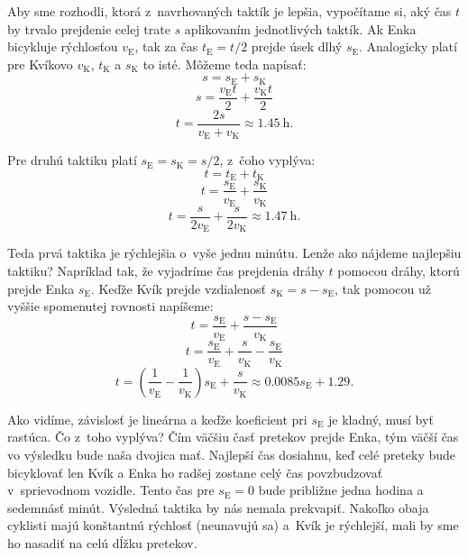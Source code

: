 Aby sme rozhodli, ktorá z~navrhovaných taktík je lepšia, vypočítame si, aký čas $t$ by trvalo prejdenie celej trate $s$ aplikovaním jednotlivých taktík.
Ak Enka bicykluje rýchlosťou $v_{\mathrm{E}}$, tak za čas $t_{\mathrm{E}} = t/2$ prejde úsek dlhý $s_{\mathrm{E}}$.
Analogicky platí pre Kvíkovo $v_{\mathrm{K}}$, $t_{\mathrm{K}}$ a $s_{\mathrm{K}}$ to isté. Môžeme teda napísať:
$$s=s_{\mathrm{E}} + s_{\mathrm{K}}$$
$$s=\frac{v_{\mathrm{E}} t}{2} + \frac{v_{\mathrm{K}} t}{2}$$
$$t=\frac{2s}{v_{\mathrm{E}} + v_{\mathrm{K}}} \approx \SI{1.45}{\hour} \text{.}$$

Pre druhú taktiku platí $s_{\mathrm{E}}=s_{\mathrm{K}}= s/2$, z~čoho vyplýva:
$$t=t_{\mathrm{E}}+t_{\mathrm{K}}$$
$$t=\frac{s_{\mathrm{E}}}{v_{\mathrm{E}}}+\frac{s_{\mathrm{K}}}{v_{\mathrm{K}}}$$
$$t=\frac{s}{2v_{\mathrm{E}}}+\frac{s}{2v_{\mathrm{K}}}  \approx \SI{1.47}{\hour} \text{.}$$

Teda prvá taktika je rýchlejšia o~vyše jednu minútu.
Lenže ako nájdeme najlepšiu taktiku? Napríklad tak, že vyjadríme čas prejdenia dráhy $t$ pomocou dráhy, ktorú prejde Enka $s_{\mathrm{E}}$.
Keďže Kvík prejde vzdialenosť $s_{\mathrm{K}}=s - s_{\mathrm{E}}$, tak pomocou už vyššie spomenutej rovnosti napíšeme:
$$t=\frac{s_{\mathrm{E}}}{v_{\mathrm{E}}}+\frac{s - s_{\mathrm{E}}}{v_{\mathrm{K}}}$$
$$t=\frac{s_{\mathrm{E}}}{v_{\mathrm{E}}}+\frac{s}{v_{\mathrm{K}}}-\frac{s_{\mathrm{E}}}{v_{\mathrm{K}}}$$
$$t=\left(\frac{1}{v_{\mathrm{E}}}-\frac{1}{v_{\mathrm{K}}}\right)s_{\mathrm{E}}+\frac{s}{v_{\mathrm{K}}} \approx 0.0085s_{\mathrm{E}}+1.29  \text{.}$$

Ako vidíme, závislosť je lineárna a keďže koeficient pri $s_{\mathrm{E}}$ je kladný, musí byť rastúca.
Čo z~toho vyplýva? Čím väčšiu časť pretekov prejde Enka, tým väčší čas vo výsledku bude naša dvojica mať.
Najlepší čas dosiahnu, keď celé preteky bude bicyklovať len Kvík a Enka ho radšej zostane celý čas povzbudzovať v~sprievodnom vozidle.
Tento čas pre $s_{\mathrm{E}}=0$ bude približne jedna hodina a sedemnásť minút.
Výsledná taktika by nás nemala prekvapiť. Nakoľko obaja cyklisti majú konštantnú rýchlosť (neunavujú sa) a~Kvík je rýchlejší, mali by sme ho nasadiť na celú dĺžku pretekov.

